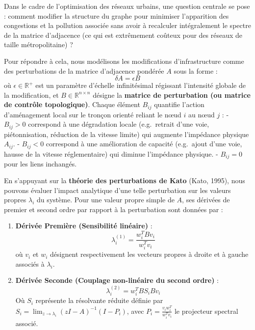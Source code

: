 \documentclass[10pt, a4paper]{article}
\providecommand{\tightlist}{}
\begin{document}
Dans le cadre de l'optimisation des réseaux urbains, une question
centrale se pose : comment modifier la structure du graphe pour
minimiser l'apparition des congestions et la pollution associée sans
avoir à recalculer intégralement le spectre de la matrice d'adjacence
(ce qui est extrêmement coûteux pour des réseaux de taille
métropolitaine) ?

Pour répondre à cela, nous modélisons les modifications d'infrastructure
comme des perturbations de la matrice d'adjacence pondérée \(A\) sous la
forme : \[\delta A = \epsilon B\] où \(\epsilon \in \mathbb{R}^+\) est
un paramètre d'échelle infinitésimal régissant l'intensité globale de la
modification, et \(B \in \mathbb{R}^{n \times n}\) désigne la
\textbf{matrice de perturbation (ou matrice de contrôle topologique)}.
Chaque élément \(B_{ij}\) quantifie l'action d'aménagement local sur le
tronçon orienté reliant le nœud \(i\) au nœud \(j\) : - \(B_{ij} > 0\)
correspond à une dégradation locale (e.g.~retrait d'une voie,
piétonnisation, réduction de la vitesse limite) qui augmente l'impédance
physique \(A_{ij}\). - \(B_{ij} < 0\) correspond à une amélioration de
capacité (e.g.~ajout d'une voie, hausse de la vitesse réglementaire) qui
diminue l'impédance physique. - \(B_{ij} = 0\) pour les liens inchangés.

En s'appuyant sur la \textbf{théorie des perturbations de Kato} (Kato,
1995), nous pouvons évaluer l'impact analytique d'une telle perturbation
sur les valeurs propres \(\lambda_i\) du système. Pour une valeur propre
simple de \(A\), ses dérivées de premier et second ordre par rapport à
la perturbation sont données par :

\begin{enumerate}
\def\labelenumi{\arabic{enumi}.}
\tightlist
\item
  \textbf{Dérivée Première (Sensibilité linéaire)} :
  \[\lambda_i^{(1)} = \frac{w_i^T B v_i}{w_i^T v_i}\] où \(v_i\) et
  \(w_i\) désignent respectivement les vecteurs propres à droite et à
  gauche associés à \(\lambda_i\).
\item
  \textbf{Dérivée Seconde (Couplage non-linéaire du second ordre)} :
  \[\lambda_i^{(2)} = w_i^T B S_i B v_i\] Où \(S_i\) représente la
  résolvante réduite définie par
  \(S_i = \lim_{z \to \lambda_i} (zI - A)^{-1}(I - P_i)\), avec
  \(P_i = \frac{v_i w_i^T}{w_i^T v_i}\) le projecteur spectral associé.
\end{enumerate}
\end{document}
